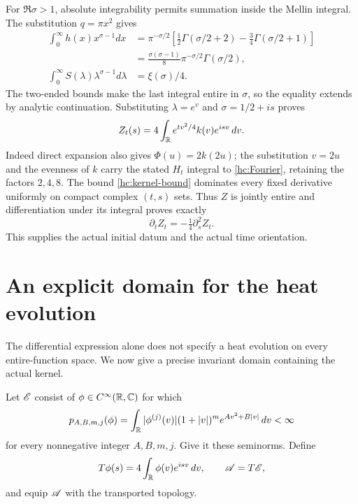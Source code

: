 For $\Re\sigma>1$, absolute integrability permits summation inside
the Mellin integral. The substitution $q=\pi x^2$ gives
\begin{align*}
\int_0^\infty h(x)x^{\sigma-1}dx
 &=\pi^{-\sigma/2}
   \left[\tfrac12\Gamma(\sigma/2+2)-\tfrac34\Gamma(\sigma/2+1)\right]\\
 &=\frac{\sigma(\sigma-1)}8\pi^{-\sigma/2}\Gamma(\sigma/2),\\
\int_0^\infty S(\lambda)\lambda^{\sigma-1}d\lambda&=\xi(\sigma)/4.
\end{align*}
The two-ended bounds make the last integral entire in $\sigma$,
so the equality extends by analytic continuation. Substituting
$\lambda=e^v$ and $\sigma=1/2+is$ proves
\begin{equation}
Z_t(s)=4\int_\mathbb R e^{tv^2/4}k(v)e^{isv}\,dv.
\label{hc:Fourier}
\end{equation}
Indeed direct expansion also gives $\Phi(u)=2k(2u)$; the substitution
$v=2u$ and the evenness of $k$ carry the stated $H_t$ integral
to \eqref{hc:Fourier}, retaining the factors $2,4,8$.
The bound \eqref{hc:kernel-bound} dominates every fixed derivative
uniformly on compact complex $(t,s)$ sets. Thus $Z$ is jointly entire
and differentiation under its integral proves exactly
\begin{equation}
\partial_t Z_t=-\tfrac14\partial_s^2 Z_t.
\label{hc:heat}
\end{equation}
This supplies the actual initial datum and the actual time orientation.

\section{An explicit domain for the heat evolution}
The differential expression alone does not specify a heat evolution
on every entire-function space. We now give a precise invariant domain
containing the actual kernel.

\begin{definition}
Let $\mathscr E$ consist of $\phi\in C^\infty(\mathbb R,\mathbb C)$ for which
\[
p_{A,B,m,j}(\phi)=\int_\mathbb R |\phi^{(j)}(v)|(1+|v|)^m
                          e^{Av^2+B|v|}\,dv<\infty
\]
for every nonnegative integer $A,B,m,j$. Give it these seminorms.
Define
\[
T\phi(s)=4\int_\mathbb R\phi(v)e^{isv}\,dv,\qquad \mathscr A=T\mathscr E,
\]
and equip $\mathscr A$ with the transported topology.
\end{definition}

